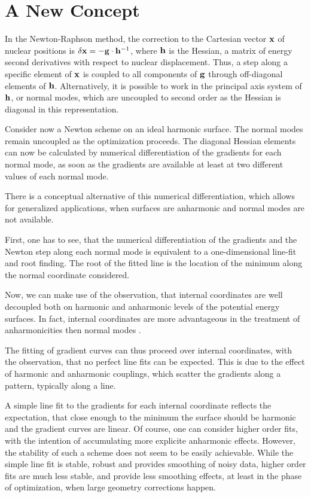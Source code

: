 \documentclass[prl,twocolumn,showpacs,twocolumngrid,superbib]{revtex4}
\begin{document}
\section{A New Concept}

In the Newton-Raphson method, the correction to the Cartesian vector $\bf x$ of nuclear positions 
is $\delta {\bf x}  = - {\bf g}\cdot {\bf h}^{-1}$,  where $\bf h$ is the Hessian, a matrix of 
energy second derivatives with respect to nuclear displacement.  Thus, a step along a specific 
element of $\bf x$ is coupled to all components of $\bf g$ through off-diagonal elements of $\bf h$.  
Alternatively, it is possible to work in the principal axis system of $\bf h$, or normal modes, 
which are uncoupled to second order as the Hessian is diagonal in this representation. 

Consider now a Newton scheme on an ideal harmonic surface.
The normal modes remain uncoupled as the optimization proceeds.
The diagonal Hessian elements can now be calculated by
numerical differentiation of the gradients 
for each normal mode, as soon as 
the gradients are available at least at two different values
of each normal mode. 

There is a conceptual alternative of this numerical
differentiation, which allows for generalized applications, when
surfaces are anharmonic and normal modes are not available. 

First, one has to see, that the numerical differentiation of the
gradients and the Newton step along each normal mode
is equivalent to a one-dimensional line-fit and root 
finding.
The root of the fitted line is the location of the 
minimum along the normal coordinate considered.

Now, we can make use of the observation, that internal coordinates
are well decoupled both on harmonic and
anharmonic levels of the potential energy surfaces. In fact,
internal coordinates are more advantageous in the
treatment of anharmonicities then normal modes \cite{fogarasi_diaghess}.

The fitting of gradient curves can thus proceed over internal coordinates,
with the observation, that no perfect line fits can be expected.
This is due to the effect of harmonic and anharmonic couplings,
which scatter the gradients along a pattern, typically along a line.

A simple line fit to the gradients for each internal coordinate
reflects the expectation, that close enough to the minimum
the surface should be harmonic and the gradient curves are linear.
Of course, one can consider higher order fits, with the intention
of accumulating more explicite anharmonic effects. However, the
stability of such a scheme does not seem to be easily achievable.
While the simple line fit is stable, robust and provides smoothing
of noisy data, higher order fits are much less stable, and provide
less smoothing effects, at least in the phase of optimization, when
large geometry corrections happen.
\end{document}

